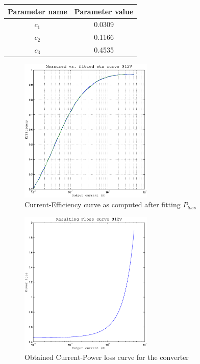 \begin{center}
\begin{tabular}{|c| c|}

    \hline
    Parameter name & Parameter value \\
    \hline
    $c_{1}$ & 0.0309 \\
    $c_{2}$ & 0.1166 \\
    $c_{3}$ & 0.4535 \\
    \hline
\end{tabular}

\begin{figure}[h]
  \centering
\includegraphics[width=2.5in]{fitted_eta}
\caption{Current-Efficiency curve as computed after fitting $P_{loss}$}
\end{figure}
\begin{figure}[h]
  \centering
\includegraphics[width=2.5in]{ploss}
\caption{Obtained Current-Power loss curve for the converter}
\end{figure}

\end{center}
